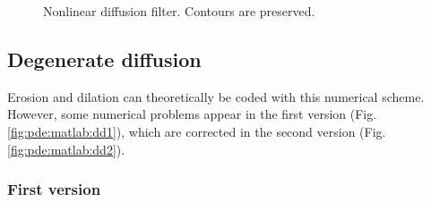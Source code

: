\begin{figure}[htbp]
\centering
{}\hfill
{}\hfill
{}
\caption{Nonlinear diffusion filter. Contours are preserved.}
\label{fig:pde:matlab:nld}
\end{figure}

\subsection{Degenerate diffusion}

Erosion and dilation can theoretically be coded with this numerical scheme. However, some numerical problems appear in the first version (Fig.\ref{fig:pde:matlab:dd1}), which are corrected in the second version (Fig.\ref{fig:pde:matlab:dd2}).

\subsubsection{First version} 

